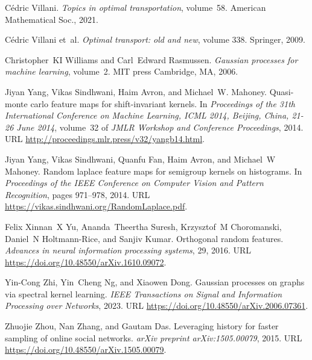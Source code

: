 \begin{thebibliography}{76}
C{\'e}dric Villani.
\newblock \emph{Topics in optimal transportation}, volume~58.
\newblock American Mathematical Soc., 2021.

C{\'e}dric Villani et~al.
\newblock \emph{Optimal transport: old and new}, volume 338.
\newblock Springer, 2009.

Christopher~KI Williams and Carl~Edward Rasmussen.
\newblock \emph{Gaussian processes for machine learning}, volume~2.
\newblock MIT press Cambridge, MA, 2006.

Jiyan Yang, Vikas Sindhwani, Haim Avron, and Michael~W. Mahoney.
\newblock Quasi-monte carlo feature maps for shift-invariant kernels.
\newblock In \emph{Proceedings of the 31th International Conference on Machine Learning, {ICML} 2014, Beijing, China, 21-26 June 2014}, volume~32 of \emph{{JMLR} Workshop and Conference Proceedings}, 2014{}.
\newblock URL \url{http://proceedings.mlr.press/v32/yangb14.html}.

Jiyan Yang, Vikas Sindhwani, Quanfu Fan, Haim Avron, and Michael~W Mahoney.
\newblock Random laplace feature maps for semigroup kernels on histograms.
\newblock In \emph{Proceedings of the IEEE Conference on Computer Vision and Pattern Recognition}, pages 971--978, 2014{}.
\newblock URL \url{https://vikas.sindhwani.org/RandomLaplace.pdf}.

Felix Xinnan~X Yu, Ananda~Theertha Suresh, Krzysztof~M Choromanski, Daniel~N Holtmann-Rice, and Sanjiv Kumar.
\newblock Orthogonal random features.
\newblock \emph{Advances in neural information processing systems}, 29, 2016.
\newblock URL \url{https://doi.org/10.48550/arXiv.1610.09072}.

Yin-Cong Zhi, Yin~Cheng Ng, and Xiaowen Dong.
\newblock Gaussian processes on graphs via spectral kernel learning.
\newblock \emph{IEEE Transactions on Signal and Information Processing over Networks}, 2023.
\newblock URL \url{https://doi.org/10.48550/arXiv.2006.07361}.

Zhuojie Zhou, Nan Zhang, and Gautam Das.
\newblock Leveraging history for faster sampling of online social networks.
\newblock \emph{arXiv preprint arXiv:1505.00079}, 2015.
\newblock URL \url{https://doi.org/10.48550/arXiv.1505.00079}.

\end{thebibliography}
